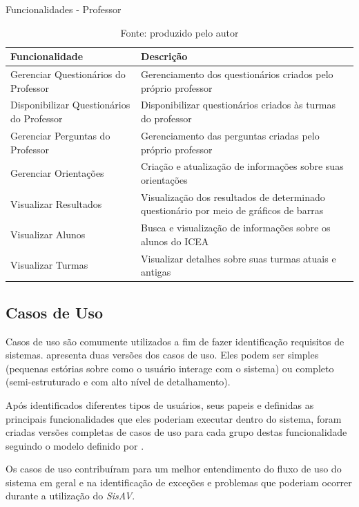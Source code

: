 \documentclass[
  12pt,       %
  openright,      %
  oneside,      %
  a4paper,      %
  english,      %
  french,        %
  spanish,     %
  brazil        %
  ]{abntex2-decsi}
\begin{document}
    \begin{table}[h]
    \centering
    \caption{Funcionalidades - Professor}
    \begin{tabular}{p{5cm} p{10cm}}
    \hline
    Funcionalidade & Descrição \\
    \hline
    \hline      
    Gerenciar Questionários do Professor & Gerenciamento dos questionários criados pelo próprio professor\\
    \hline
    Disponibilizar Questionários do Professor & Disponibilizar questionários criados às turmas do professor\\
    \hline
    Gerenciar Perguntas do Professor & Gerenciamento das perguntas criadas pelo próprio professor\\
    \hline
    Gerenciar Orientações & Criação e atualização de informações sobre suas orientações\\
    \hline
    Visualizar Resultados & Visualização dos resultados de determinado questionário por meio de gráficos de barras\\
    \hline
    Visualizar Alunos & Busca e visualização de informações sobre os alunos do ICEA\\
    \hline
    Visualizar Turmas & Visualizar detalhes sobre suas turmas atuais e antigas\\
    \hline            
    \end{tabular}
    \caption*{Fonte: produzido pelo autor}
    \label{tab:funcoes-prof}
    \end{table}
	
    \newpage 
    
    \subsection{Casos de Uso}

    Casos de uso são comumente utilizados a fim de fazer identificação requisitos de sistemas.  apresenta duas versões dos casos de uso. Eles podem ser simples (pequenas estórias sobre como o usuário interage com o sistema) ou completo (semi-estruturado e com alto nível de detalhamento).  

    Após identificados diferentes tipos de usuários, seus papeis e definidas as principais funcionalidades que eles poderiam executar dentro do sistema, foram criadas versões completas de casos de uso para cada grupo destas funcionalidade seguindo o modelo definido por . 

    Os casos de uso contribuíram para um melhor entendimento do fluxo de uso do sistema em geral e na identificação de exceções e problemas que poderiam ocorrer durante a utilização do \textit{SisAV}. 
    
\end{document}
